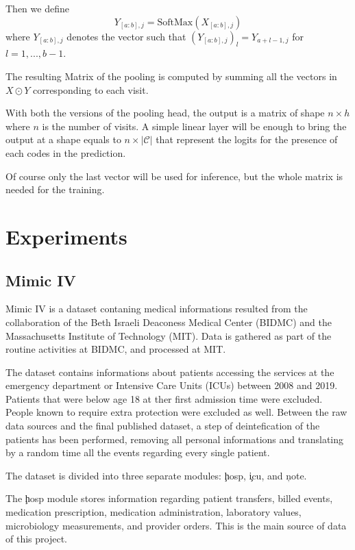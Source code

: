 \documentclass[]{marticle}
\newcommand{\codes}{\mathcal{C}}
\begin{document}
Then we define
\begin{equation*}
   Y_{[a:b], j} = \text{SoftMax}(X_{[a:b], j})
\end{equation*}
where $Y_{[a:b], j}$ denotes the vector such that $(Y_{[a:b], j})_l = Y_{a+l-1, j}$ for ${{l=1,..., b-1}}$.

The resulting Matrix of the pooling is computed by summing all the vectors in $X\odot Y$
corresponding to each visit.

With both the versions of the pooling head, the output is a matrix of shape $n \times h$ where $n$
is the number of visits. A simple linear layer will be enough to bring the output at a shape equals
to $n \times |\codes|$ that represent the logits for the presence of each codes in the prediction.

Of course only the last vector will be used for inference, but the whole matrix is needed for the
training.

\section{Experiments}

\subsection{Mimic IV}

Mimic IV \cite{mimic-iv-cit} is a dataset contaning medical informations resulted from the collaboration
of the Beth Israeli Deaconess Medical Center (BIDMC) and the Massachusetts Institute of Technology
(MIT). Data is gathered as part of the routine activities at BIDMC, and processed at MIT.

The dataset contains informations about patients accessing the services at the emergency department
or Intensive Care Units (ICUs) between 2008 and 2019. Patients that were below age 18 at ther first
admission time were excluded. People known to require extra protection were excluded as well.
Between the raw data sources and the final published dataset, a step of deintefication of the
patients has been performed, removing all personal informations and translating by a random time all
the events regarding every single patient.

The dataset is divided into three separate modules: \c{hosp}, \c{icu}, and \c{note}.

The \c{hosp} module stores information regarding patient transfers, billed events, medication
prescription, medication administration, laboratory values, microbiology measurements, and provider
orders. This is the main source of data of this project.
\end{document}
